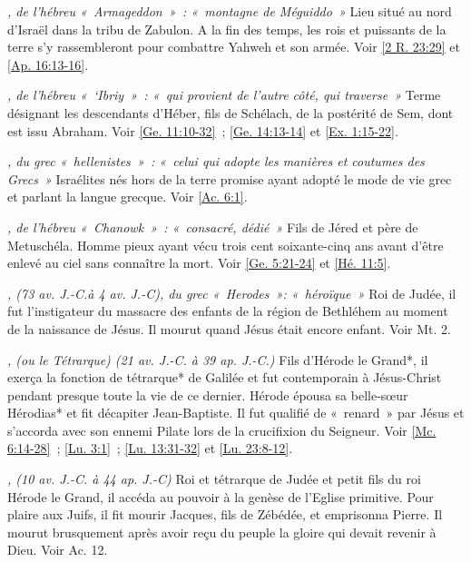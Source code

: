\begin{multicols}{2}
\textit{, de l'hébreu «~Armageddon~»~: «~montagne de Méguiddo~»}\newline
Lieu situé au nord d'Israël dans la tribu de Zabulon. A la fin des temps, les rois et puissants de la terre s'y rassembleront pour combattre Yahweh et son armée. Voir \vref{2 R. 23:29} et \vref{Ap. 16:13-16}.

\textit{, de l'hébreu «~`Ibriy~»~: «~qui provient de l'autre côté, qui traverse~»}\newline
Terme désignant les descendants d'Héber, fils de Schélach, de la postérité de Sem, dont est issu Abraham. Voir \vref{Ge. 11:10-32}~; \vref{Ge. 14:13-14} et \vref{Ex. 1:15-22}.

\textit{, du grec «~hellenistes~»~: «~celui qui adopte les manières et coutumes des Grecs~»}\newline
Israélites nés hors de la terre promise ayant adopté le mode de vie grec et parlant la langue grecque. Voir \vref{Ac. 6:1}.

\textit{, de l'hébreu «~Chanowk~»~: «~consacré, dédié~»}\newline
Fils de Jéred et père de Metuschéla. Homme pieux ayant vécu trois cent soixante-cinq ans avant d'être enlevé au ciel sans connaître la mort. Voir \vref{Ge. 5:21-24} et \vref{Hé. 11:5}.

\textit{, (73 av. J.-C.à 4 av. J.-C), du grec «~Herodes~»: «~héroïque~»}\newline
Roi de Judée, il fut l'instigateur du massacre des enfants de la région de Bethléhem au moment de la naissance de Jésus. Il mourut quand Jésus était encore enfant. Voir Mt. 2.

\textit{, (ou le Tétrarque) (21 av. J.-C. à 39 ap. J.-C.)}\newline
Fils d'Hérode le Grand*, il exerça la fonction de tétrarque* de Galilée et fut contemporain à Jésus-Christ pendant presque toute la vie de ce dernier. Hérode épousa sa belle-sœur Hérodias* et fit décapiter Jean-Baptiste. Il fut qualifié de «~renard~» par Jésus et s'accorda avec son ennemi Pilate lors de la crucifixion du Seigneur. Voir \vref{Mc. 6:14-28}~; \vref{Lu. 3:1}~; \vref{Lu. 13:31-32} et \vref{Lu. 23:8-12}.

\textit{, (10 av. J.-C. à 44 ap. J.-C)}\newline
Roi et tétrarque de Judée et petit fils du roi Hérode le Grand, il accéda au pouvoir à la genèse de l'Eglise primitive. Pour plaire aux Juifs, il fit mourir Jacques, fils de Zébédée, et emprisonna Pierre. Il mourut brusquement après avoir reçu du peuple la gloire qui devait revenir à Dieu. Voir Ac. 12.


\end{multicols}
